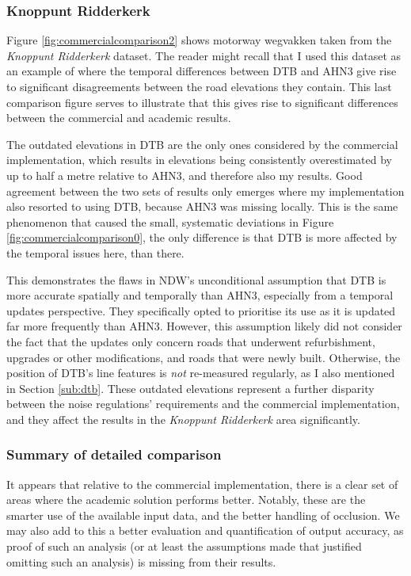 \subsubsection{Knoppunt Ridderkerk}

Figure \ref{fig:commercialcomparison2} shows motorway wegvakken taken from the \textit{Knoppunt Ridderkerk} dataset. The reader might recall that I used this dataset as an example of where the temporal differences between DTB and AHN3 give rise to significant disagreements between the road elevations they contain. This last comparison figure serves to illustrate that this gives rise to significant differences between the commercial and academic results.

The outdated elevations in DTB are the only ones considered by the commercial implementation, which results in elevations being consistently overestimated by up to half a metre relative to AHN3, and therefore also my results. Good agreement between the two sets of results only emerges where my implementation also resorted to using DTB, because AHN3 was missing locally. This is the same phenomenon that caused the small, systematic deviations in Figure \ref{fig:commercialcomparison0}, the only difference is that DTB is more affected by the temporal issues here, than there.

This demonstrates the flaws in NDW's unconditional assumption that DTB is more accurate spatially and temporally than AHN3, especially from a temporal updates perspective. They specifically opted to prioritise its use as it is updated far more frequently than AHN3. However, this assumption likely did not consider the fact that the updates only concern roads that underwent refurbishment, upgrades or other modifications, and roads that were newly built. Otherwise, the position of DTB's line features is \textit{not} re-measured regularly, as I also mentioned in Section \ref{sub:dtb}. These outdated elevations represent a further disparity between the noise regulations' requirements and the commercial implementation, and they affect the results in the \textit{Knoppunt Ridderkerk} area significantly.

\subsubsection{Summary of detailed comparison}

It appears that relative to the commercial implementation, there is a clear set of areas where the academic solution performs better. Notably, these are the smarter use of the available input data, and the better handling of occlusion. We may also add to this a better evaluation and quantification of output accuracy, as proof of such an analysis (or at least the assumptions made that justified omitting such an analysis) is missing from their results. 

